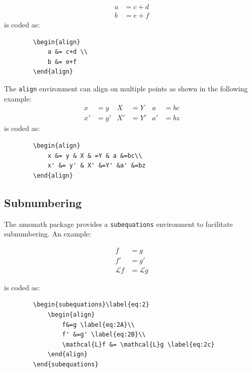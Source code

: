 \documentclass[lettersize,journal]{IEEEtran}
\begin{document}
	\begin{align}
		a &= c+d \\
		b &= e+f
	\end{align}
	\noindent is coded as:
	\begin{verbatim}
		\begin{align}
			a &= c+d \\
			b &= e+f
		\end{align}
	\end{verbatim}
	
	The {\tt{align}} environment can align on multiple  points as shown in the following example:
	\begin{align}
		x &= y & X & =Y & a &=bc\\
		x' &= y' & X' &=Y' &a' &=bz
	\end{align}
	\noindent is coded as:
	\begin{verbatim}
		\begin{align}
			x &= y & X & =Y & a &=bc\\
			x' &= y' & X' &=Y' &a' &=bz
		\end{align}
	\end{verbatim}
	
	
	
	
	
	\subsection{Subnumbering}
	The amsmath package provides a {\tt{subequations}} environment to facilitate subnumbering. An example:
	
	\begin{subequations}\label{eq:2}
		\begin{align}
			f&=g \label{eq:2A}\\
			f' &=g' \label{eq:2B}\\
			\mathcal{L}f &= \mathcal{L}g \label{eq:2c}
		\end{align}
	\end{subequations}
	
	\noindent is coded as:
	\begin{verbatim}
		\begin{subequations}\label{eq:2}
			\begin{align}
				f&=g \label{eq:2A}\\
				f' &=g' \label{eq:2B}\\
				\mathcal{L}f &= \mathcal{L}g \label{eq:2c}
			\end{align}
		\end{subequations}
		
	\end{verbatim}
	
\end{document}
